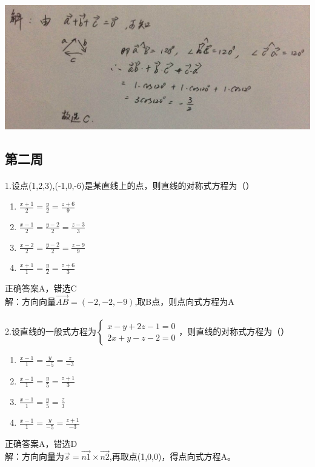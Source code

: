 \documentclass[fleqn]{article}
\begin{document}
\begin{flushleft}
\includegraphics[scale=0.3]{13.jpg}
\subsection{第二周}
\paragraph{ }
1.设点(1,2,3),(-1,0,-6)是某直线上的点，则直线的对称式方程为（）
\begin{enumerate}
\item $\frac{x+1}{2}=\frac{y}{2}=\frac{z+6}{9}$\\
\item $\frac{x-1}{2}=\frac{y-2}{2}=\frac{z-3}{3}$\\
\item $\frac{x-2}{2}=\frac{y-2}{2}=\frac{z-9}{9}$\\
\item $\frac{x+1}{1}=\frac{y}{2}=\frac{z+6}{3}$
\end{enumerate}
正确答案A，错选C\\
解：方向向量$\overrightarrow{AB}=(-2,-2,-9)$,取B点，则点向式方程为A

\paragraph{ }
2.设直线的一般式方程为$\left\{
\begin{array}{ll}
x-y+2z-1=0\\
2x+y-z-2=0
\end{array}
\right. 
$，则直线的对称式方程为（）
\begin{enumerate}
\item $\frac{x-1}{1}=\frac{y}{-5}=\frac{z}{-3}$\\
\item $\frac{x-1}{1}=\frac{y}{5}=\frac{z+1}{3}$\\
\item $\frac{x-1}{1}=\frac{y}{5}=\frac{z}{3}$\\
\item $\frac{x-1}{1}=\frac{y}{-5}=\frac{z+1}{-3}$
\end{enumerate}
正确答案A，错选D\\
解：方向向量为$\overrightarrow{s}=\overrightarrow{n1}\times\overrightarrow{n2}$,再取点(1,0,0)，得点向式方程A。


\end{flushleft}
\end{document}
